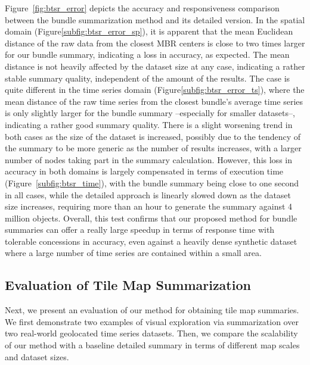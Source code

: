 Figure~\ref{fig:btsr_error} depicts the accuracy and responsiveness comparison between the bundle summarization method and its detailed version. In the spatial domain (Figure\ref{subfig:btsr_error_sp}), it is apparent that the mean Euclidean distance of the raw data from the closest MBR centers is close to two times larger for our bundle summary, indicating a loss in accuracy, as expected. The mean distance is not heavily affected by the dataset size at any case, indicating a rather stable summary quality, independent of the amount of the results. The case is quite different in the time series domain (Figure\ref{subfig:btsr_error_ts}), where the mean distance of the raw time series from the closest bundle's average time series is only slightly larger for the bundle summary --especially for smaller datasets--, indicating a rather good summary quality. There is a slight worsening trend in both cases as the size of the dataset is increased, possibly due to the tendency of the summary to be more generic as the number of results increases, with a larger number of \btsr nodes taking part in the summary calculation. However, this loss in accuracy in both domains is largely compensated in terms of execution time (Figure~\ref{subfig:btsr_time}), with the bundle summary being close to one second in all cases, while the detailed approach is linearly slowed down as the dataset size increases, requiring more than an hour to generate the summary against 4 million objects. Overall, this test confirms that our proposed method for bundle summaries can offer a really large speedup in terms of response time with tolerable concessions in accuracy, even against a heavily dense synthetic dataset where a large number of time series are contained within a small area.

\subsection{Evaluation of Tile Map Summarization}
\label{subsec:tilemap_sum}

Next, we present an evaluation of our method for obtaining tile map summaries. We first demonstrate two examples of visual exploration via summarization over two real-world geolocated time series datasets. Then, we compare the scalability of our method with a baseline detailed summary in terms of different map scales and dataset sizes.

